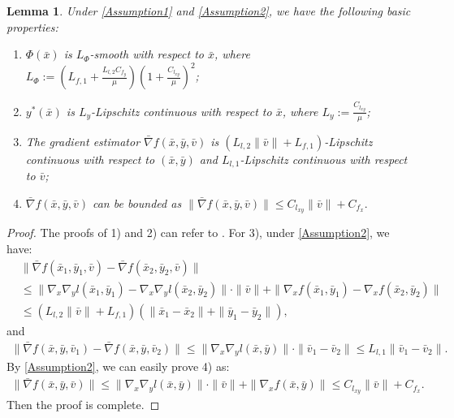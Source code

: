 \documentclass{article}
\theoremstyle{plain}
\newtheorem{lemma}[lemma]{Lemma}
\theoremstyle{definition}
\theoremstyle{remark}
\begin{document}
  \begin{lemma}\label{Lemma2} Under \cref{Assumption1} and \cref{Assumption2}, we have the following basic properties:
\begin{enumerate}
    \item[1).] \(\Phi(\bar{x})\) is \(L_{\Phi}\)-smooth with respect to \(\bar{x}\), where 
    $L_{\Phi} := \left(L_{f,1} + \frac{L_{l,2} C_{f_y}}{\mu} \right)\left(1 + \frac{C_{l_{xy}}}{\mu}\right)^2$;
    \item[2).] \({y}^*(\bar{x})\) is \(L_y\)-Lipschitz continuous with respect to \(\bar{x}\), where $L_y := \frac{C_{l_{xy}}}{\mu}$;
    \item[3).] The gradient estimator \(\bar{\nabla} f(\bar{x}, \bar{y}, \bar{v})\) is \((L_{l,2} \|\bar{v}\| + L_{f,1})\)-Lipschitz continuous with respect to \((\bar{x}, \bar{y})\) and \(L_{l,1}\)-Lipschitz continuous with respect to \(\bar{v}\);
    \item[4).] \(\bar{\nabla} f(\bar{x}, \bar{y}, \bar{v})\) can be bounded as $\|\bar{\nabla} f(\bar{x}, \bar{y}, \bar{v})\| \leq C_{l_{xy}} \|\bar{v}\| + C_{f_x}.$
\end{enumerate}
\end{lemma}

\begin{proof}
The proofs of 1) and 2) can refer to \citep{ghadimi2018approximation}. For 3), under \cref{Assumption2}, we have:
\begin{align}
   &\|\bar{\nabla} f(\bar{x}_1, \bar{y}_1, \bar{v}) - \bar{\nabla} f(\bar{x}_2, \bar{y}_2, \bar{v})\| \nonumber\\
&\leq \|\nabla_{{x}}\nabla_{{y}} l(\bar{x}_1, \bar{y}_1) - \nabla_{{x}}\nabla_{{y}} l(\bar{x}_2, \bar{y}_2)\| \cdot \|\bar{v}\|
+ \|\nabla_{{x}} f(\bar{x}_1, \bar{y}_1) - \nabla_{{x}} f(\bar{x}_2, \bar{y}_2)\| \nonumber\\
&\leq (L_{l,2} \|\bar{v}\| + L_{f,1})(\|\bar{x}_1 - \bar{x}_2\| + \|\bar{y}_1 - \bar{y}_2\|),\label{eq22}
\end{align}
and
\begin{align}
\|\bar{\nabla} f(\bar{x}, \bar{y}, \bar{v}_1) - \bar{\nabla} f(\bar{x}, \bar{y}, \bar{v}_2)\| 
\leq \|\nabla_{{x}} \nabla_{{y}} l(\bar{x}, \bar{y})\| \cdot \|\bar{v}_1 - \bar{v}_2\| 
\leq L_{l,1} \|\bar{v}_1 - \bar{v}_2\|.\label{eq23}
\end{align}
By \cref{Assumption2}, we can easily prove 4) as:
\begin{align}
\|\bar{\nabla} f(\bar{x}, \bar{y}, \bar{v})\| \leq \|\nabla_{{x}} \nabla_{{y}} l(\bar{x}, \bar{y})\| \cdot \|\bar{v}\| + \|\nabla_{{x}} f(\bar{x}, \bar{y})\| 
\leq C_{l_{xy}} \|\bar{v}\| + C_{f_x}.\label{eq24}
\end{align}
Then the proof is complete.
\end{proof} 
\end{document}
